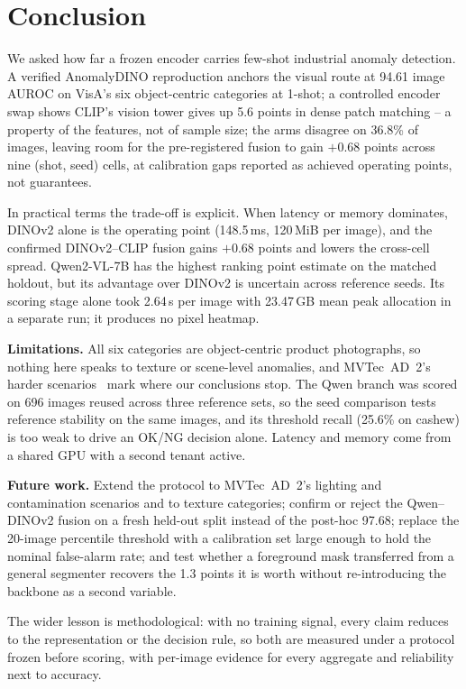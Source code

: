 \section{Conclusion}
\label{sec:conclusion}

We asked how far a frozen encoder carries few-shot industrial anomaly detection. A verified
AnomalyDINO reproduction anchors the visual route at 94.61 image AUROC on VisA's six
object-centric categories at 1-shot; a controlled encoder swap shows CLIP's vision tower
gives up 5.6 points in dense patch matching -- a property of the features, not of sample
size; the arms disagree on 36.8\% of images, leaving room for the pre-registered fusion to
gain $+0.68$ points across nine (shot, seed) cells, at calibration gaps reported as achieved
operating points, not guarantees.

In practical terms the trade-off is explicit. When latency or memory dominates, DINOv2 alone
is the operating point (148.5\,ms, 120\,MiB per image), and the confirmed DINOv2--CLIP fusion
gains $+0.68$ points and lowers the cross-cell spread. Qwen2-VL-7B has the highest
ranking point estimate on the matched holdout, but its advantage over DINOv2 is uncertain
across reference seeds. Its scoring stage alone took 2.64\,s per image with 23.47\,GB
mean peak allocation in a separate run; it produces no pixel heatmap.

\textbf{Limitations.} All six categories are object-centric product photographs, so nothing
here speaks to texture or scene-level anomalies, and MVTec~AD~2's harder
scenarios~\cite{hecklerkram2026mvtec2} mark where our conclusions stop. The Qwen branch was
scored on 696 images reused across three reference sets, so the seed comparison tests reference stability on the same images, and its threshold recall (25.6\% on cashew) is too weak to
drive an OK/NG decision alone. Latency and memory come from a shared GPU with a second
tenant active.

\textbf{Future work.} Extend the protocol to MVTec~AD~2's lighting and contamination
scenarios and to texture categories; confirm or reject the Qwen--DINOv2 fusion on a fresh
held-out split instead of the post-hoc 97.68; replace the 20-image percentile threshold with
a calibration set large enough to hold the nominal false-alarm rate; and test whether a
foreground mask transferred from a general segmenter recovers the 1.3 points it is worth
without re-introducing the backbone as a second variable.

The wider lesson is methodological: with no training signal, every claim reduces to the
representation or the decision rule, so both are measured under a protocol frozen before
scoring, with per-image evidence for every aggregate and reliability next to accuracy.
